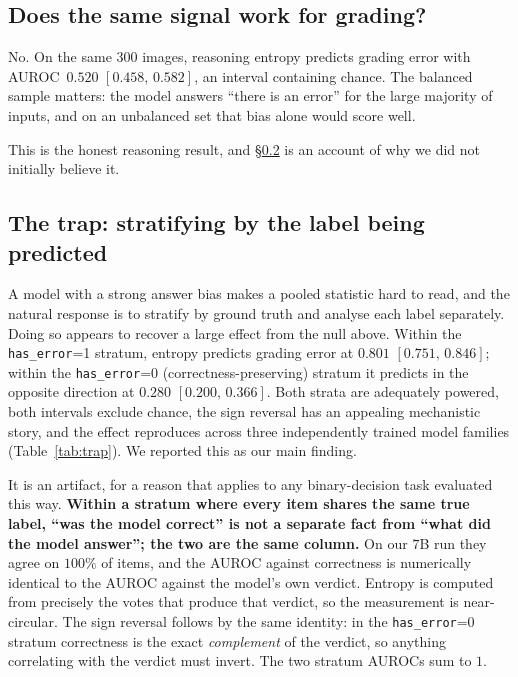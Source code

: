 \documentclass[10pt,twocolumn,letterpaper]{article}
\newcommand{\ci}[2]{{\small$[#1,\,#2]$}}
\begin{document}
\subsection{Does the same signal work for grading?}
\label{sec:q3}
No. On the same $300$ images, reasoning entropy predicts grading error
with AUROC~$0.520$ \ci{0.458}{0.582}, an interval containing chance. The
balanced sample matters: the model answers ``there is an error'' for the
large majority of inputs, and on an unbalanced set that bias alone would
score well.

This is the honest reasoning result, and \S\ref{sec:trap} is an account of
why we did not initially believe it.

\subsection{The trap: stratifying by the label being predicted}
\label{sec:trap}
A model with a strong answer bias makes a pooled statistic hard to read,
and the natural response is to stratify by ground truth and analyse each
label separately. Doing so appears to recover a large effect from the null
above. Within the \texttt{has\_error}=1 stratum, entropy predicts grading
error at $0.801$ \ci{0.751}{0.846}; within the \texttt{has\_error}=0
(correctness-preserving) stratum it predicts in the opposite direction at
$0.280$ \ci{0.200}{0.366}. Both
strata are adequately powered, both intervals exclude chance, the sign
reversal has an appealing mechanistic story, and the effect reproduces
across three independently trained model families
(Table~\ref{tab:trap}). We reported this as our main finding.

It is an artifact, for a reason that applies to any binary-decision task
evaluated this way. \textbf{Within a stratum where every item shares the
same true label, ``was the model correct'' is not a separate fact from
``what did the model answer''; the two are the same column.} On our
$7$B run they agree on $100\%$ of items, and the AUROC against correctness
is numerically identical to the AUROC against the model's own verdict.
Entropy is computed from precisely the votes that produce that verdict, so
the measurement is near-circular. The sign reversal follows by the same
identity: in the \texttt{has\_error}=0 stratum correctness is the exact
\emph{complement} of the verdict, so anything correlating with the verdict
must invert. The two stratum AUROCs sum to $1$.
\end{document}
